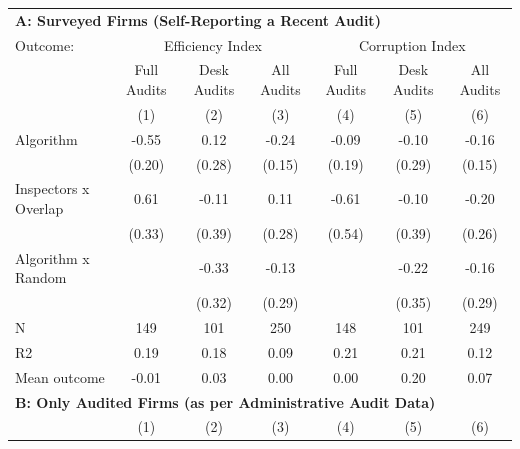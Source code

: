 \begin{tabular}{lccc|ccc} \toprule
\multicolumn{7}{l}{\textbf{A: Surveyed Firms (Self-Reporting a Recent Audit)}} \\ \multicolumn{1}{l}{Outcome:} & \multicolumn{3}{c}{Efficiency Index} & \multicolumn{3}{c}{Corruption Index} \\ \multicolumn{1}{l}{} & Full Audits & Desk Audits & All Audits & Full Audits & Desk Audits & All Audits \\ \multicolumn{1}{l}{} & (1) & (2) & (3) & (4) & (5) & (6) \\ \midrule
Algorithm   &       -0.55\sym{***}&        0.12         &       -0.24         &       -0.09         &       -0.10         &       -0.16         \\
            &      (0.20)         &      (0.28)         &      (0.15)         &      (0.19)         &      (0.29)         &      (0.15)         \\
\addlinespace
Inspectors x Overlap&        0.61\sym{*}  &       -0.11         &        0.11         &       -0.61         &       -0.10         &       -0.20         \\
            &      (0.33)         &      (0.39)         &      (0.28)         &      (0.54)         &      (0.39)         &      (0.26)         \\
\addlinespace
Algorithm x Random&                     &       -0.33         &       -0.13         &                     &       -0.22         &       -0.16         \\
            &                     &      (0.32)         &      (0.29)         &                     &      (0.35)         &      (0.29)         \\
\midrule
N           &         149         &         101         &         250         &         148         &         101         &         249         \\
R2          &        0.19         &        0.18         &        0.09         &        0.21         &        0.21         &        0.12         \\
Mean outcome&       -0.01         &        0.03         &        0.00         &        0.00         &        0.20         &        0.07         \\

\midrule \multicolumn{7}{l}{\textbf{B: Only Audited Firms (as per Administrative Audit Data)}} \\ \multicolumn{1}{l}{} & (1) & (2) & (3) & (4) & (5) & (6) \\ \midrule


\end{tabular}
